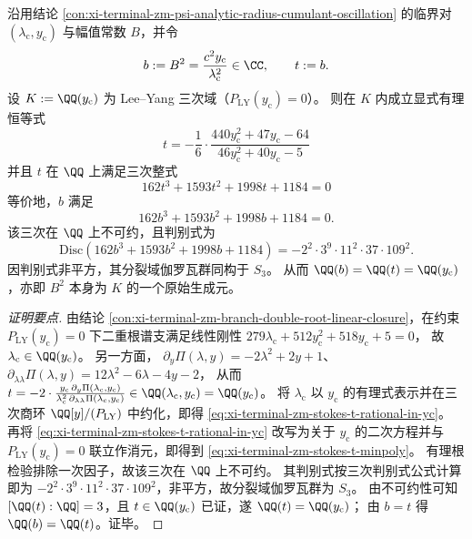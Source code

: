 \begin{theorem}\label{thm:xi-terminal-zm-stokes-amplitude-square-cubic-rigidity}
沿用结论 \ref{con:xi-terminal-zm-psi-analytic-radius-cumulant-oscillation} 的临界对 \((\lambda_{\mathrm c},y_{\mathrm c})\) 与幅值常数 \(B\)，并令
\[
b:=B^{2}=\frac{c^{2}y_{\mathrm c}}{\lambda_{\mathrm c}^{2}}\in\CC,
\qquad t:=b.
\]
设 \(K:=\QQ(y_{\mathrm c})\) 为 Lee--Yang 三次域（\(P_{\mathrm{LY}}(y_{\mathrm c})=0\)）。
则在 \(K\) 内成立显式有理恒等式
\begin{equation}\label{eq:xi-terminal-zm-stokes-t-rational-in-yc}
\boxed{\;
t
=-\frac{1}{6}\cdot
\frac{440y_{\mathrm c}^{2}+47y_{\mathrm c}-64}{46y_{\mathrm c}^{2}+40y_{\mathrm c}-5}\;}
\end{equation}
并且 \(t\) 在 \(\QQ\) 上满足三次整式
\begin{equation}\label{eq:xi-terminal-zm-stokes-t-minpoly}
\boxed{\;
162t^{3}+1593t^{2}+1998t+1184=0\;}
\end{equation}
等价地，\(b\) 满足
\[
162b^{3}+1593b^{2}+1998b+1184=0.
\]
该三次在 \(\QQ\) 上不可约，且判别式为
\[
\mathrm{Disc}(162b^{3}+1593b^{2}+1998b+1184)
=-2^{2}\cdot 3^{9}\cdot 11^{2}\cdot 37\cdot 109^{2}.
\]
因判别式非平方，其分裂域伽罗瓦群同构于 \(S_3\)。
从而 \(\QQ(b)=\QQ(t)=\QQ(y_{\mathrm c})\)，亦即 \(B^2\) 本身为 \(K\) 的一个原始生成元。
\end{theorem}
\begin{proof}[证明要点]
由结论 \ref{con:xi-terminal-zm-branch-double-root-linear-closure}，在约束 \(P_{\mathrm{LY}}(y_{\mathrm c})=0\) 下二重根谱支满足线性刚性
\(
279\lambda_{\mathrm c}+512y_{\mathrm c}^{2}+518y_{\mathrm c}+5=0
\)，
故 \(\lambda_{\mathrm c}\in \QQ(y_{\mathrm c})\)。
另一方面，
\(
\partial_y\Pi(\lambda,y)=-2\lambda^2+2y+1
\)、
\(
\partial_{\lambda\lambda}\Pi(\lambda,y)=12\lambda^2-6\lambda-4y-2
\)，
从而
\(
t=-2\cdot\frac{y_{\mathrm c}\,\partial_y\Pi(\lambda_{\mathrm c},y_{\mathrm c})}{\lambda_{\mathrm c}^{2}\,\partial_{\lambda\lambda}\Pi(\lambda_{\mathrm c},y_{\mathrm c})}
\in \QQ(\lambda_{\mathrm c},y_{\mathrm c})
=\QQ(y_{\mathrm c})
\)。
将 \(\lambda_{\mathrm c}\) 以 \(y_{\mathrm c}\) 的有理式表示并在三次商环 \(\QQ[y]/(P_{\mathrm{LY}})\) 中约化，即得 \eqref{eq:xi-terminal-zm-stokes-t-rational-in-yc}。
再将 \eqref{eq:xi-terminal-zm-stokes-t-rational-in-yc} 改写为关于 \(y_{\mathrm c}\) 的二次方程并与 \(P_{\mathrm{LY}}(y_{\mathrm c})=0\) 联立作消元，即得到 \eqref{eq:xi-terminal-zm-stokes-t-minpoly}。
有理根检验排除一次因子，故该三次在 \(\QQ\) 上不可约。
其判别式按三次判别式公式计算即为
\(
-2^{2}\cdot 3^{9}\cdot 11^{2}\cdot 37\cdot 109^{2}
\)，非平方，故分裂域伽罗瓦群为 \(S_3\)。
由不可约性可知 \([\QQ(t):\QQ]=3\)，且 \(t\in\QQ(y_{\mathrm c})\) 已证，遂 \(\QQ(t)=\QQ(y_{\mathrm c})\)；
由 \(b=t\) 得 \(\QQ(b)=\QQ(t)\)。证毕。
\end{proof}

